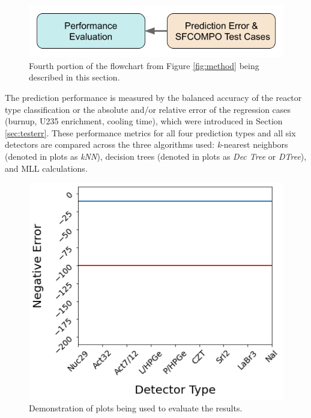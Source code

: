 
\begin{figure}[H]
  \centering
  \includegraphics[width=0.7\linewidth]{./chapters/exp1/methodology4.png}
  \caption{Fourth portion of the flowchart from Figure \ref{fig:method} being 
           described in this section.}
\end{figure}

The prediction performance is measured by the balanced accuracy of the reactor
type classification or the absolute and/or relative error of the regression
cases (burnup, \gls{U235} enrichment, cooling time), which were introduced in
Section \ref{sec:testerr}.  These performance metrics for all four prediction
types and all six detectors are compared across the three algorithms used:
\textit{k}-nearest neighbors (denoted in plots as \textit{kNN}), decision trees
(denoted in plots as \textit{Dec Tree} or \textit{DTree}), and \gls{MLL}
calculations.  

\begin{figure}[!htb]
  \centering
  \includegraphics[width=0.5\linewidth]{./chapters/exp2/exp2_plot_description.png}
  \caption{Demonstration of plots being used to evaluate the results.}
  \label{fig:detdemo}
\end{figure}

